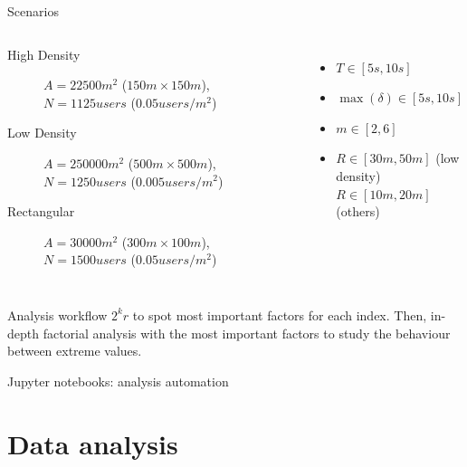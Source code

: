 \documentclass[aspectratio=169]{beamer}
\begin{document}
\begin{frame}{Scenarios}
	\begin{columns}
		\begin{description}
			\item[High Density] \(A = 22500m^2\) (\(150m \times
				150m\)), \(N = 1125\mathit{users}\) (\(0.05
					\mathit{users}/m^2\))
			\item[Low Density] \(A = 250000m^2\) (\(500m \times
				500m\)), \(N = 1250\mathit{users}\) (\(0.005
					\mathit{users}/m^2\))
			\item[Rectangular] \(A = 30000m^2\) (\(300m \times
				100m\)), \(N = 1500\mathit{users}\) (\(0.05
					\mathit{users}/m^2\))
		\end{description}
		\begin{itemize}
			\item \(T \in [5s, 10s]\)
			\item \(\max(\delta) \in [5s, 10s]\)
			\item \(m \in [2, 6]\)
			\item \(R \in [30m, 50m]\) (low density)\\
				\(R \in [10m, 20m]\) (others)
		\end{itemize}
	\end{columns}
	\begin{block}{Analysis workflow}
		\(2^{k}r\) to spot most important factors for each index. Then,
		in-depth factorial analysis with the most important factors to
		study the behaviour between extreme values.
	\end{block}
	Jupyter notebooks: analysis automation
\end{frame}

\section{Data analysis}
\end{document}
